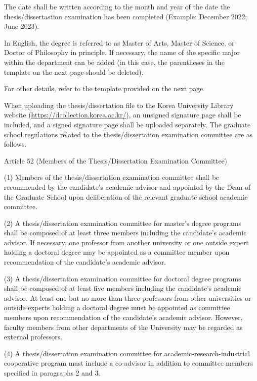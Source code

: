 \documentclass[11pt]{report}
\numberwithin{figure}{section}
\theoremstyle{plain}
\theoremstyle{definition}
\theoremstyle{corollary}
\theoremstyle{definition}
\theoremstyle{plain}
\theoremstyle{definition}
\theoremstyle{plain}
\begin{document}
\bigskip

The date shall be written according to the month and year of the date the thesis/dissertastion examination has been completed
(Example: December 2022; June 2023).

In English, the degree is referred to as Master of Arts, Master of Science, or Doctor of Philosophy in principle.
If necessary, the name of the specific major within the department can be added (in this case, the parentheses in the template on the next page should be deleted).

For other details, refer to the template provided on the next page.

When uploading the thesis/dissertation file to the Korea University Library website (\url{https://dcollection.korea.ac.kr/}), an unsigned signature page shall be included, and a signed signature page shall be uploaded separately.
The graduate school regulations related to the thesis/dissertation examination committee are as follows.

\bigskip

Article 52 (Members of the Thesis/Dissertation Examination Committee)

(1) Members of the thesis/dissertation examination committee shall be recommended by the candidate’s academic advisor and appointed by the Dean of the Graduate School upon deliberation of the relevant graduate school academic committee.

(2) A thesis/dissertation examination committee for master’s degree programs shall be composed of at least three members including the candidate’s academic advisor.
If necessary, one professor from another university or one outside expert holding a doctoral degree may be appointed as a committee member upon recommendation of the candidate’s academic advisor.

(3) A thesis/dissertation examination committee for doctoral degree programs shall be composed of at least five members including the candidate’s academic advisor.
At least one but no more than three professors from other universities or outside experts holding a doctoral degree must be appointed as committee members upon recommendation of the candidate’s academic advisor.
However, faculty members from other departments of the University may be regarded as external professors.

(4) A thesis/dissertation examination committee for academic-research-industrial cooperative program must include a co-advisor in addition to committee members specified in paragraphs 2 and 3.
\end{document}
